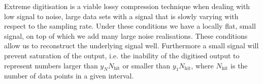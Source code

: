 \documentclass[apj]{emulateapj}
\begin{document}
Extreme digitisation is a viable lossy compression technique when dealing with low signal to noise, large data sets with a signal that is slowly varying with respect to the sampling rate. Under these conditions we have a locally flat, small signal, on top of which we add many large noise realisations. These conditions allow us to reconstruct the underlying signal well. Furthermore a small signal will prevent saturation of the output, i.e. the inability of the digitised output to represent numbers larger than $y_N N_{\mathrm{hit}}$ or smaller than $y_1 N_{\mathrm{hit}}$, where $N_{\mathrm{hit}}$ is the number of data points in a given interval.


\end{document}
